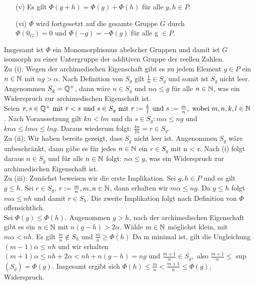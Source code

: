 {\begin{enumerate}
Sei $r \notin S_g \text{ und } s \notin S_h \text{, so folgt } r+s \notin S_{g+h}$. 
\item[(v)] Es gilt $\Phi\left( g+h\right) = \Phi\left(g\right) + \Phi\left(h\right)$ für alle $g, h \in P$. 
\item[(vi)] $\Phi$ wird fortgesetzt auf die gesamte Gruppe $G$ durch $\Phi\left(0_G\right) = 0 \text{ und } \Phi \left(-g\right) = -\Phi \left(g\right)$ für alle g $\in P$. \\ 
\end{enumerate}
Insgesamt ist $\Phi$ ein Monomorphismus abelscher Gruppen und damit ist $G$ isomorph zu einer Untergruppe der additiven Gruppe der reellen Zahlen.\\ 
Zu (i): Wegen der archimedischen Eigenschaft gibt es zu jedem Element $g \in P$ ein $n \in \mathbb{N}$ mit $ng > \alpha$. Nach Definition von $S_g$ gilt $\frac{1}{n} \in S_g$ und somit ist $S_g$ nicht leer.\\ Angenommen $S_g = \mathbb{Q}^{+}$, dann wäre $n \in S_g$ und $n\alpha \le g$ für alle $n\in\mathbb{N}$, was ein Widerspruch zur archimedischen Eigenschaft ist.\\
Seien $r, s \in \mathbb{Q}^{+} \text{ mit } r < s \text{ und } s \in S_g \text { mit } r := \frac{k}{l} \text{ und } s:= \frac{m}{n}, \text{ wobei } m, n ,k, l \in \mathbb{N}$. Nach Voraussetzung gilt $kn < lm $ und da $s \in S_g: m\alpha \le ng$ und $kn\alpha \le lm\alpha \le lng.$ Daraus wiederum folgt: $\frac{kn}{ln} = r \in S_g$.\\
Zu (ii): Wir haben bereits gezeigt, dass $S_g$ nicht leer ist. Angenommen $S_g$ wäre unbeschränkt, dann gäbe es für jedes $n \in \mathbb{N}$ ein $r \in S_g$ mit n < r. Nach (i) folgt daraus $n \in S_g$ und für alle $n \in \mathbb{N}$ folgt: $ n\alpha \le g$, was ein Widerspruch zur archimedischen Eigenschaft ist.\\
Zu (iii): Zunächst beweisen wir die erste Implikation. Sei  $g, h \in P$ und es gilt $g \le h$. Sei $r \in S_g$, $r:= \frac{m}{n}, m, n \in \mathbb{N} $, dann erhalten wir $m\alpha \le ng$. Da $g \le h$ folgt $ m\alpha \le n h$ und damit $r \in S_h$. Die zweite Implikation folgt nach Definition von $\Phi$ offensichtlich.\\
Sei $\Phi\left(g\right) \le \Phi\left(h\right)$. Angenommen $g > h$, nach der archimedischen Eigenschaft gibt es ein $ n \in \mathbb{N}$ mit $n\left(g-h\right) > 2\alpha$. Wähle $m \in \mathbb{N}$ möglichst klein, mit $m\alpha < nh$. Es gilt $\frac{m}{n} \notin S_h$ und $\frac{m}{n} \geq \Phi\left(h\right)$
Da m minimal ist, gilt die Ungleichung $\left(m-1\right)\alpha \le nh$ und wir erhalten $ \left(m+1\right)\alpha \le nh + 2\alpha < nh + n(g-h) = ng$ und $\frac{m+1}{n} \in S_g,$ also $\frac{m+1}{n} \leq$ sup$\left(S_g\right) = \Phi\left(g\right)$. Insgesamt ergibt sich $\Phi\left(h\right) \le \frac{m}{n} < \frac{m + 1}{n} \le \Phi\left(g\right)$, Widerspruch.\\
}
